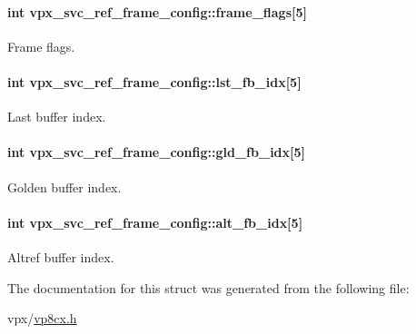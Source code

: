 \paragraph[{\texorpdfstring{frame\+\_\+flags}{frame_flags}}]{\setlength{\rightskip}{0pt plus 5cm}int vpx\+\_\+svc\+\_\+ref\+\_\+frame\+\_\+config\+::frame\+\_\+flags\mbox{[}5\mbox{]}}\hypertarget{structvpx__svc__ref__frame__config_ad0981cd49c317dff4cdf7078a0440545}{}\label{structvpx__svc__ref__frame__config_ad0981cd49c317dff4cdf7078a0440545}
Frame flags. 
\paragraph[{\texorpdfstring{lst\+\_\+fb\+\_\+idx}{lst_fb_idx}}]{\setlength{\rightskip}{0pt plus 5cm}int vpx\+\_\+svc\+\_\+ref\+\_\+frame\+\_\+config\+::lst\+\_\+fb\+\_\+idx\mbox{[}5\mbox{]}}\hypertarget{structvpx__svc__ref__frame__config_a19b5483bc516fc83469d5967dc966783}{}\label{structvpx__svc__ref__frame__config_a19b5483bc516fc83469d5967dc966783}
Last buffer index. 
\paragraph[{\texorpdfstring{gld\+\_\+fb\+\_\+idx}{gld_fb_idx}}]{\setlength{\rightskip}{0pt plus 5cm}int vpx\+\_\+svc\+\_\+ref\+\_\+frame\+\_\+config\+::gld\+\_\+fb\+\_\+idx\mbox{[}5\mbox{]}}\hypertarget{structvpx__svc__ref__frame__config_a4af48b570c3262ad1d6fc7d436a7d5cc}{}\label{structvpx__svc__ref__frame__config_a4af48b570c3262ad1d6fc7d436a7d5cc}
Golden buffer index. 
\paragraph[{\texorpdfstring{alt\+\_\+fb\+\_\+idx}{alt_fb_idx}}]{\setlength{\rightskip}{0pt plus 5cm}int vpx\+\_\+svc\+\_\+ref\+\_\+frame\+\_\+config\+::alt\+\_\+fb\+\_\+idx\mbox{[}5\mbox{]}}\hypertarget{structvpx__svc__ref__frame__config_ab2a913dc166956efad8bdf6ad009b2eb}{}\label{structvpx__svc__ref__frame__config_ab2a913dc166956efad8bdf6ad009b2eb}
Altref buffer index. 

The documentation for this struct was generated from the following file\+:\begin{DoxyCompactItemize}
\item 
vpx/\hyperlink{vp8cx_8h}{vp8cx.\+h}\end{DoxyCompactItemize}
